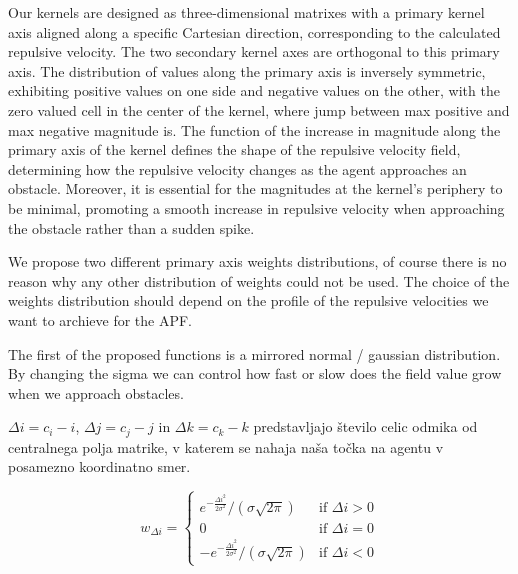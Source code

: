 \documentclass[letterpaper, 10 pt, conference]{ieeeconf}  %
\begin{document}
Our kernels are designed as three-dimensional matrixes with a primary kernel axis aligned along a specific Cartesian direction, corresponding to the calculated repulsive velocity. The two secondary kernel axes are orthogonal to this primary axis. The distribution of values along the primary axis is inversely symmetric, exhibiting positive values on one side and negative values on the other, with the zero valued cell in the center of the kernel, where jump between max positive and max negative magnitude is. The function of the increase in magnitude along the primary axis of the kernel defines the shape of the repulsive velocity field, determining how the repulsive velocity changes as the agent approaches an obstacle. Moreover, it is essential for the magnitudes at the kernel's periphery to be minimal, promoting a smooth increase in repulsive velocity when approaching the obstacle rather than a sudden spike.



We propose two different primary axis weights distributions, of course there is no reason why any other distribution of weights could not be used. The choice of the weights distribution should depend on the profile of the repulsive velocities we want to archieve for the APF. 

The first of the proposed functions is a mirrored normal / gaussian distribution. By changing the sigma we can control how fast or slow does the field value grow when we approach obstacles.

$\Delta i = c_i - i$, $\Delta j = c_j - j$ in $\Delta k = c_k - k$ predstavljajo število celic odmika od centralnega polja matrike, v katerem se nahaja naša točka na agentu v posamezno koordinatno smer.

\begin{equation}
w_{\Delta i} = 
\begin{cases} 
	e^{-\frac{\Delta i^2}{2\sigma^2}} / (\sigma \sqrt{2\pi}) & \text{if } \Delta i > 0 \\
	0 & \text{if } \Delta i = 0 \\
	-e^{-\frac{\Delta i^2}{2\sigma^2}} / (\sigma \sqrt{2\pi}) & \text{if } \Delta i < 0 
\end{cases}
\end{equation}

\end{document}
